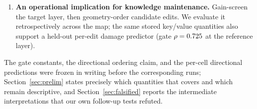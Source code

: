 \documentclass[preprint,12pt]{elsarticle}
\theoremstyle{definition}
\begin{document}
\begin{enumerate}
mass is negligible in all cells) and not differential geometry-tracking (the received
cross-talk norm is geometry-predicted at $\rho\approx0.99$ in every cell we re-analyzed).
Aligned
cross-talk arrives everywhere; what flips is its effect at the readout: a boost in
low-gain regimes, a penalty in high-gain regimes. Section~\ref{sec:mech} gives this
formal structure. A short proposition, proved from a first-order expansion under stated
assumptions, identifies the two quantities we measure---cell gain and constructive
fraction---as estimates of the magnitude and the sign of the readout slope at the edit's
operating point; a separately labeled conjecture supplies the operating-point account
that ties that sign to the layer's gain, with three predictions, one already confirmed
and one decisive falsification test we name but do not run.
\item \textbf{An operational implication for knowledge maintenance.} Gain-screen the target layer, then geometry-order
candidate edits. We evaluate it retrospectively across the map; the same stored key/value
quantities also support a held-out per-edit damage predictor (gate $\rho=0.725{}$
at the reference layer).
\end{enumerate}

The gate constants, the directional ordering claim, and the per-cell directional
predictions were frozen in writing before the corresponding runs; Section~\ref{sec:prelim}
states precisely which quantities that covers and which remain descriptive, and
Section~\ref{sec:falsified} reports the intermediate interpretations that our own
follow-up tests refuted.
\end{document}
